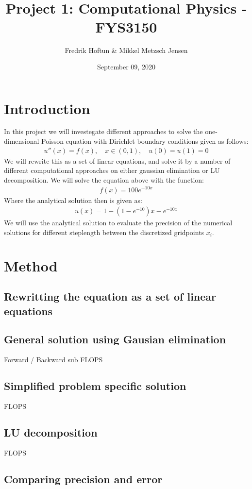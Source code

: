 \documentclass[american,a4paper,12pt]{article}
\title{Project 1: Computational Physics - FYS3150}
\author{Fredrik Hoftun \& Mikkel Metzsch Jensen}
\date{September 09, 2020}
\begin{document}
\maketitle

\section{Introduction}
  In this project we will investegate different approaches to solve the one-dimensional Poisson equation with Dirichlet boundary conditions given as follows:
  \begin{align*}
    u''(x) = f(x), \quad x \in (0,1), \quad u(0) = u(1) = 0
  \end{align*}
  We will rewrite this as a set of linear equations, and solve it by a number of different computational approaches on either gaussian elimination or LU decomposition. We will solve the equation above with the function:
  \begin{align*}
    f(x) = 100e^{-10x}
  \end{align*}
  Where the analytical solution then is given as:
  \begin{align*}
    u(x) = 1 - (1 - e^{-10})x - e^{-10x}
  \end{align*}
  We will use the analytical solution to evaluate the precision of the numerical solutions for different steplength between the discretized gridpoints $x_i$. 
\section{Method}
  \subsection{Rewritting the equation as a set of linear equations}
  \subsection{General solution using Gausian elimination}
    Forward / Backward sub
    FLOPS
  \subsection{Simplified problem specific solution}
    FLOPS
  \subsection{LU decomposition}
    FLOPS
  \subsection{Comparing precision and error}
\end{document}
